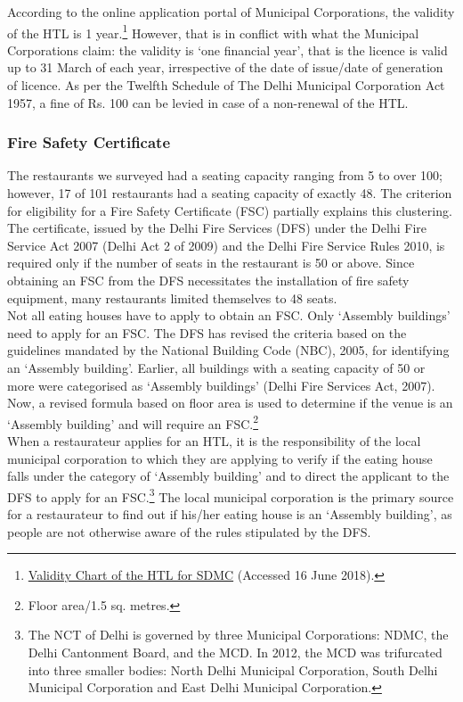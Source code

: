 \documentclass[a4paper, 12pt, twoside]{article}
\begin{document}
                    According to the online application portal of Municipal Corporations, the validity of the HTL is 1 year.\footnote{\href{https://bit.ly/2Qzd92r}{Validity Chart of the HTL for SDMC} (Accessed 16 June 2018).} However, that is in conflict with what the Municipal Corporations claim: the validity is ‘one financial year’, that is the licence is valid up to 31 March of each year, irrespective of the date of issue/date of generation of licence. As per the Twelfth Schedule of The Delhi Municipal Corporation Act 1957, a fine of Rs. 100 can be levied in case of a non-renewal of the HTL. %
  
		\subsubsection{Fire Safety Certificate}
		The restaurants we surveyed had a seating capacity ranging from 5 to over 100; however, 17 of 101 restaurants had a seating capacity of exactly 48. The criterion for eligibility for a Fire Safety Certificate (FSC) partially explains this clustering. The 
certificate, issued by the Delhi Fire Services (DFS) under the Delhi Fire Service Act 2007 (Delhi Act 2 of 2009) and the Delhi Fire Service Rules 2010, is required only if the number of seats in the restaurant is 50 or above. Since obtaining an FSC from the DFS 
necessitates the installation of fire safety equipment, many restaurants limited themselves to 48 seats. \\ %
		
		Not all eating houses have to apply to obtain an FSC. Only ‘Assembly buildings’ need to apply for an FSC. The DFS has revised the criteria based on the guidelines mandated by the National Building Code (NBC), 2005, for identifying an ‘Assembly 
building’. Earlier, all buildings with a seating capacity of 50 or more were categorised as ‘Assembly buildings’ (Delhi Fire Services Act, 2007). Now, a revised formula based on floor area is used to determine if the venue is an ‘Assembly building’ and will require an 
FSC.\footnote{Floor area/1.5 sq. metres.} \\
		
		When a restaurateur applies for an HTL, it is the responsibility of the local municipal corporation to which they are applying to verify if the eating house falls under the category of ‘Assembly building’ and to direct the applicant to the DFS to apply for an 
FSC.\footnote{The NCT of Delhi is governed by three Municipal Corporations: NDMC, the Delhi Cantonment Board, and the MCD. In 2012, the MCD was trifurcated into three smaller bodies: North Delhi Municipal Corporation, South Delhi Municipal Corporation 
and East Delhi Municipal Corporation.} The local municipal corporation is the primary source for a restaurateur to find out if his/her eating house is an ‘Assembly building’, as people are not otherwise aware of the rules stipulated by the DFS. \\ %
		
\end{document}
